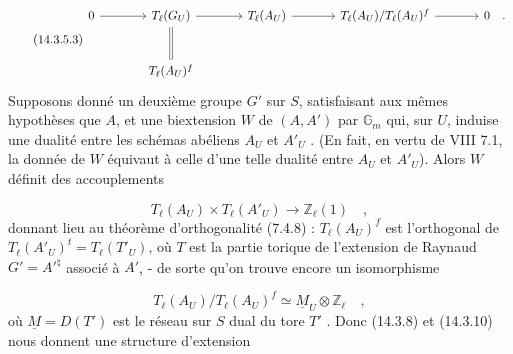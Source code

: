 \begin{equation}\tag{14.3.5.3}
\begin{tikzcd}[row sep=large, column sep=large]
0 \arrow[r] & T_\ell(G_U) \arrow[r] \arrow[d, equal] & T_\ell(A_U) \arrow[r] & T_\ell(A_U)/T_\ell(A_U)^f \arrow[r] & 0 \quad . \\
& T_\ell(A_U)^f
\end{tikzcd}
\end{equation}
Supposons donné un deuxième groupe $G'$ sur $S$, satisfaisant aux mêmes hypothèses que $A$, et une biextension $W$ de $(A,A')$ par $\mathbb{G}_m$ qui, sur $U$, induise une dualité entre les schémas abéliens $A_U$ et $A'_U$ . (En fait, en vertu de VIII 7.1, la donnée de $W$ équivaut à celle d'une telle dualité entre $A_U$ et $A'_U$). Alors $W$ définit des accouplements

\begin{equation}\tag{14.3.5.4}
T_\ell(A_U) \times T_\ell(A'_U) \longrightarrow \mathbb{Z}_\ell(1) \quad ,
\end{equation}
donnant lieu au théorème d'orthogonalité (7.4.8) : $T_\ell(A_U)^f$ est l'orthogonal de $T_\ell(A'_U)^t = T_\ell(T'_U)$, où $T$ est la partie torique de l'extension de Raynaud $G' = {A'}^{\natural}$ associé à $A'$, - de sorte qu'on trouve encore un isomorphisme

\begin{equation}\tag{14.3.5.5}
T_\ell(A_U)/T_\ell(A_U)^f \simeq \underline{M}_U \otimes \mathbb{Z}_\ell \quad ,
\end{equation}
où $\underline{M} = D(T')$ est le réseau sur $S$ dual du tore $T'$ . Donc (14.3.8) et (14.3.10) nous donnent une structure d'extension

